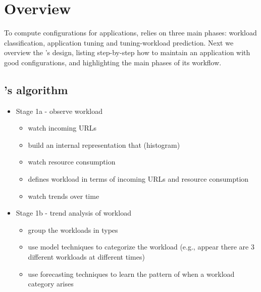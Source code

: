 \section{\name Overview}

To compute configurations for applications, \name relies on three main phases:
workload classification, application tuning and tuning-workload prediction. Next
we overview the \name's design, listing step-by-step how to maintain an
application with good configurations, and highlighting the main phases of its
workflow.

\subsection{\name's algorithm}

 \begin{itemize}

   \item Stage 1a - observe workload

     \begin{itemize}

       \item watch incoming URLs

       \item build an internal representation that (histogram)

       \item watch resource consumption

       \item defines workload in terms of incoming URLs and resource consumption

       \item watch trends over time

     \end{itemize}

   \item Stage 1b - trend analysis of workload

     \begin{itemize}

       \item group the workloads in types

       \item use model techniques to categorize the workload (e.g., appear there
         are 3 different workloads at different times)

       \item use forecasting techniques to learn the pattern of when a workload category arises


\end{itemize}
\end{itemize}
